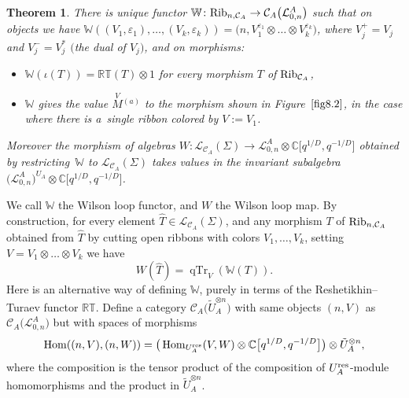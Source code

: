 \documentclass[pdftex]{sigma}%
\numberwithin{equation}{section}
\numberwithin{figure}{section}
\newtheorem{teo}{Theorem}[section]
\newcommand{\Ll}{{\mathcal L}}
\newcommand{\ra}{\rightarrow}
\begin{document}
\begin{teo} \label{Winv}
There is unique functor ${\mathbb W}\colon {\rm Rib}_{n,\mathcal{C}_A}\rightarrow \mathcal{C}_{A}\big(\Ll_{0,n}^A\big)$ such that on objects we have ${\mathbb W}((V_1,\varepsilon_1),\dots,(V_k,\varepsilon_k)) = \big(n,V_1^{\varepsilon_1}\otimes \dots\otimes V_k^{\varepsilon_k}\big)$, where $V_j^{+}=V_j$ and $V_j^{-} = V_j^*$ $($the dual of $V_j)$, and on morphisms:
\begin{itemize}\itemsep=0pt
\item ${\mathbb W}(\iota(T))=\mathbb{RT}(T) \otimes 1$ for every morphism $T$ of ${\rm Rib}_{\mathcal{C}_A}$,
\item ${\mathbb W}$ gives %
 the value $\stackrel{V}{M}{}^{\!\!(a)}$ to the morphism shown in Figure~$\ref{fig8.2}$, in the case where there is a~single ribbon colored by $V:=V_1$.
\end{itemize}
Moreover the morphism of algebras $W\colon \mathcal{L}_{\mathcal{C}_{A}}(\Sigma) \ra \Ll_{0,n}^A\otimes {\mathbb C}\big[q^{1/D},q^{-1/D}\big]$ obtained by restric\-ting~$\mathbb{W}$ to $\mathcal{L}_{\mathcal{C}_{A}}(\Sigma)$ takes values in the invariant subalgebra $\big(\Ll_{0,n}^A\big)^{U_A}\otimes {\mathbb C}\big[q^{1/D},q^{-1/D}\big]$.
\end{teo}
We call ${\mathbb W}$ the Wilson loop functor, and $W$ the Wilson loop map. By construction, for every element $\hat{T}\in \mathcal{L}_{\mathcal{C}_{A}}(\Sigma)$, and any morphism $T$ of ${\rm Rib}_{n,\mathcal{C}_A}$ obtained from $\hat{T}$ by cutting open ribbons with colors $V_1,\dots,V_k$, setting $V=V_1\otimes \dots \otimes V_k$ we have
\begin{equation}\label{Trhol}
W(\hat{T}) = \operatorname{qTr}_V\left( {\mathbb W}(T)\right).
\end{equation}
Here is an alternative way of defining ${\mathbb W}$, purely in terms of the Reshetikhin--Turaev functor $\mathbb{RT}$. Define a category $\mathcal{C}_{A}\big(\tilde U_A^{\otimes n}\big)$ with same objects $(n,V)$ as $\mathcal{C}_{A}\big(\Ll_{0,n}^A\big)$ but with spaces of morphisms
\[
\operatorname{Hom}( (n,V), (n,W))=\big( \operatorname{Hom}_ {U_A^{\rm res}}(V,W)\otimes {\mathbb C}\big[q^{1/D},q^{-1/D}\big]\big) \otimes \tilde U_A^{\otimes n},
\]
where the composition is the tensor product of the composition of $U_A^{\rm res}$-module homomorphisms and the product in $\tilde U_A^{\otimes n}$.
\end{document}
